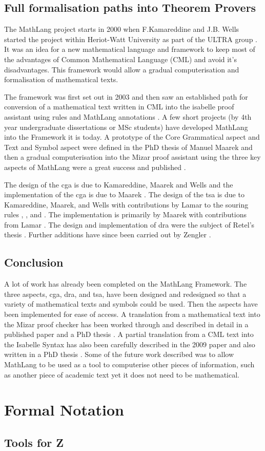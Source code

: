 \subsection{Full formalisation paths into Theorem Provers}

The MathLang project starts in 2000 when F.Kamareddine and J.B. Wells started the project within Heriot-Watt University as part of the ULTRA group \cite{researchprop}. It was an idea for a new mathematical language and framework to keep most of the advantages of Common Mathematical Language (CML) and avoid it's disadvantages. This framework would allow a gradual computerisation and formalisation of mathematical texts.

The framework was first set out in 2003 \cite{firstyear} and then saw an established path for conversion of a mathematical text written in CML into the isabelle proof assistant using rules and MathLang annotations \cite{secondyear}. A few short projects (by 4th year undergraduate dissertations or MSc students) have developed MathLang into the Framework it is today. A prototype of the Core Grammatical aspect and Text and Symbol aspect were defined in the PhD thesis of Manuel Maarek \cite{manuelphd} and then a gradual computerisation into the Mizar proof assistant using the three key aspects of MathLang were a great success and published \cite{mathintomizar}.

The design of the \gls{cga} is due to Kamareddine, Maarek and Wells \cite{oomathlang} and the implementation of the \gls{cga} is due to Maarek \cite{manuelphd}. The design of the \gls{tsa} is due to Kamareddine, Maarek, and Wells with contributions by Lamar to the souring rules \cite{restoringtsa}, \cite{manuelphd}, and \cite{lamarphd}. The implementation is primarily by Maarek \cite{manuelphd} with contributions from Lamar \cite{lamarphd}. The design and implementation of \gls{dra} were the subject of Retel's thesis \cite{krzysztofphd}. Further additions have since been carried out by Zengler \cite{cmtim}.

\subsection{Conclusion}
A lot of work has already been completed on the MathLang Framework. The three aspects, \gls{cga}, \gls{dra}, and \gls{tsa}, have been designed and redesigned so that a variety of mathematical texts and symbols could be used. Then the aspects have been implemented for ease of access. A translation from a mathematical text into the Mizar proof checker has been worked through and described in detail in a published paper \cite{mathintomizar} and a PhD thesis \cite{manuelphd}. A partial translation from a CML text into the Isabelle Syntax has also been carefully described in the 2009 paper \cite{mathintoisa} and also written in a PhD thesis \cite{lamarphd}. Some of the future work described was to allow MathLang to be used as a tool to computerise other pieces of information, such as another piece of academic text yet it does not need to be mathematical.

\section{Formal Notation}
\label{sec:formnot}

\subsection{Tools for Z}
\label{subsec:tools}